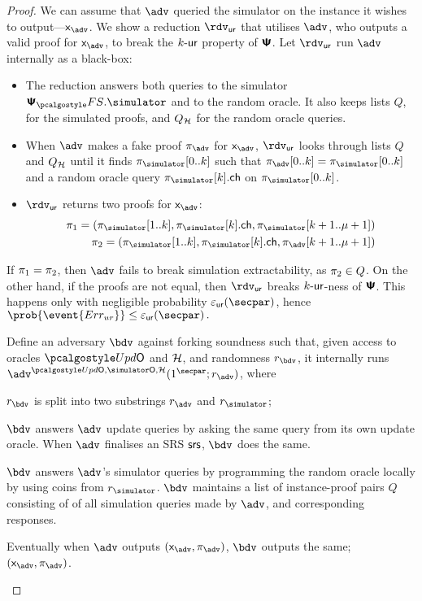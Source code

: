 \begin{proof}
{  We can assume that $\advse$ queried the simulator on the instance it wishes to
  output---$\inp_{\advse}$. We show a reduction $\rdvur$ that utilises $\advse$,
  who outputs a valid proof for $\inp_{\advse}$, to break the ${k\text{-}\mathsf{ur}}$ property of
  $\bm{\mathsf{\Psi}}$. Let $\rdvur$ run $\advse$ internally as a black-box:
\begin{itemize}
	\item The reduction answers both queries to the simulator $\psfs.\simulator$ and to the random oracle. 
	It also keeps lists $Q$, for the simulated proofs, and $Q_{\mathcal{H}}$ for the random oracle queries. 
\item When $\advse$ makes a fake proof $\zkproof_{\advse}$ for $\inp_{\advse}$,
  $\rdvur$ looks through lists $Q$ and $Q_{\mathcal{H}}$ until it finds
  $\zkproof_{\simulator}[0..k]$ such that
  $\zkproof_{\advse}[0..k] = \zkproof_{\simulator}[0..k]$
  and a random oracle query $\zkproof_{\simulator}[k].\ch$ on
  $\zkproof_{\simulator}[0..k]$.
	\item $\rdvur$ returns two proofs for $\inp_{\advse}$:
	\begin{align*}
		\zkproof_1 = (\zkproof_{\simulator}[1..k],
		\zkproof_{\simulator}[k].\ch, \zkproof_{\simulator}[k + 1..\mu + 1])\\
		\zkproof_2 = (\zkproof_{\simulator}[1..k],
		\zkproof_{\simulator}[k].\ch, \zkproof_{\advse}[k + 1..\mu + 1])
	\end{align*}
	\end{itemize}  
	If $\pi_1 = \pi_2$, then $\advse$ fails to break simulation
  extractability, as $\pi_2 \in Q$. On the other hand, if the proofs are
  not equal, then $\rdvur$ breaks ${k\text{-}\mathsf{ur}}$-ness of $\bm{\mathsf{\Psi}}$. This happens only with
  negligible probability $\epsur(\secpar)$, hence \( \prob{\event{\errur}} \leq
  \epsur(\secpar)\,. \)
}
%
		 Define an adversary $\bdv$ against forking soundness such that, given access to oracles $\initU$ and $\mathcal{H}$, and randomness $r_\bdv$, it internally runs $\advse^{\initU, \simO, \ro} (1^\secpar; r_\adv)$, where
		\begin{compactenum}
			\item $r_\bdv$ is split into two substrings $r_\adv$ and $r_\simulator$;
			\item $\bdv$ answers $\adv$ update queries by asking the same query from its own update oracle. When $\adv$ finalises an SRS $\mathsf{srs}$, $\bdv$ does the same.
			\item $\bdv$ answers $\adv$'s simulator queries by programming the random oracle locally by using coins from $r_\simulator$.
			$\bdv$ maintains a list of instance-proof pairs $Q$ consisting of of all simulation queries made by $\adv$, and corresponding responses.
			\item Eventually when $\adv$ outputs $(\inp_\advse, \zkproof_\advse)$, $\bdv$ outputs the same; $(\inp_\advse, \zkproof_\advse)$.


\end{compactenum}
\end{proof}

